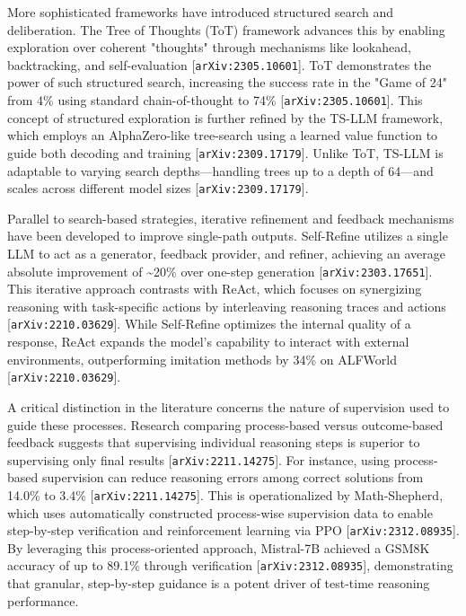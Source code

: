 \documentclass[11pt]{article}
\begin{document}
More sophisticated frameworks have introduced structured search and deliberation. The Tree of Thoughts (ToT) framework advances this by enabling exploration over coherent "thoughts" through mechanisms like lookahead, backtracking, and self-evaluation [\texttt{arXiv:2305.10601}]. ToT demonstrates the power of such structured search, increasing the success rate in the "Game of 24" from 4\% using standard chain-of-thought to 74\% [\texttt{arXiv:2305.10601}]. This concept of structured exploration is further refined by the TS-LLM framework, which employs an AlphaZero-like tree-search using a learned value function to guide both decoding and training [\texttt{arXiv:2309.17179}]. Unlike ToT, TS-LLM is adaptable to varying search depths—handling trees up to a depth of 64—and scales across different model sizes [\texttt{arXiv:2309.17179}].

Parallel to search-based strategies, iterative refinement and feedback mechanisms have been developed to improve single-path outputs. Self-Refine utilizes a single LLM to act as a generator, feedback provider, and refiner, achieving an average absolute improvement of \textasciitilde{}20\% over one-step generation [\texttt{arXiv:2303.17651}]. This iterative approach contrasts with ReAct, which focuses on synergizing reasoning with task-specific actions by interleaving reasoning traces and actions [\texttt{arXiv:2210.03629}]. While Self-Refine optimizes the internal quality of a response, ReAct expands the model's capability to interact with external environments, outperforming imitation methods by 34\% on ALFWorld [\texttt{arXiv:2210.03629}].

A critical distinction in the literature concerns the nature of supervision used to guide these processes. Research comparing process-based versus outcome-based feedback suggests that supervising individual reasoning steps is superior to supervising only final results [\texttt{arXiv:2211.14275}]. For instance, using process-based supervision can reduce reasoning errors among correct solutions from 14.0\% to 3.4\% [\texttt{arXiv:2211.14275}]. This is operationalized by Math-Shepherd, which uses automatically constructed process-wise supervision data to enable step-by-step verification and reinforcement learning via PPO [\texttt{arXiv:2312.08935}]. By leveraging this process-oriented approach, Mistral-7B achieved a GSM8K accuracy of up to 89.1\% through verification [\texttt{arXiv:2312.08935}], demonstrating that granular, step-by-step guidance is a potent driver of test-time reasoning performance.
\end{document}
